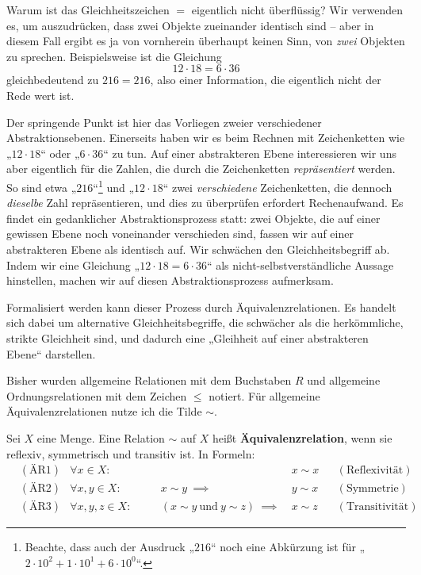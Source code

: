 \begin{bem} \label{aequirelphilo}
    Warum ist das Gleichheitszeichen $=$ eigentlich nicht überflüssig? Wir verwenden es, um auszudrücken, dass zwei Objekte zueinander identisch sind -- aber in diesem Fall ergibt es ja von vornherein überhaupt keinen Sinn, von \emph{zwei} Objekten zu sprechen. Beispielsweise ist die Gleichung
        \[ 12\cdot 18 = 6\cdot 36 \]
    gleichbedeutend zu $216=216$, also einer Information, die eigentlich nicht der Rede wert ist.
    
    Der springende Punkt ist hier das Vorliegen zweier verschiedener Abstraktionsebenen. Einerseits haben wir es beim Rechnen mit Zeichenketten wie „$12\cdot 18$“ oder „$6\cdot 36$“ zu tun. Auf einer abstrakteren Ebene interessieren wir uns aber eigentlich für die Zahlen, die durch die Zeichenketten \emph{repräsentiert} werden. So sind etwa „$216$“\footnote{Beachte, dass auch der Ausdruck „$216$“ noch eine Abkürzung ist für „$2\cdot 10^2 + 1\cdot 10^1 + 6 \cdot 10^0$“.} und „$12\cdot 18$“ zwei \emph{verschiedene} Zeichenketten, die dennoch \emph{dieselbe} Zahl repräsentieren, und dies zu überprüfen erfordert Rechenaufwand. Es findet ein gedanklicher Abstraktionsprozess statt: zwei Objekte, die auf einer gewissen Ebene noch voneinander verschieden sind, fassen wir auf einer abstrakteren Ebene als identisch auf. Wir schwächen den Gleichheitsbegriff ab. Indem wir eine Gleichung „$12\cdot 18=6\cdot 36$“ als nicht-selbstverständliche Aussage hinstellen, machen wir auf diesen Abstraktionsprozess aufmerksam.
    
    Formalisiert werden kann dieser Prozess durch Äquivalenzrelationen. Es handelt sich dabei um alternative Gleichheitsbegriffe, die schwächer als die herkömmliche, strikte Gleichheit sind, und dadurch eine „Gleihheit auf einer abstrakteren Ebene“ darstellen.

    Bisher wurden allgemeine Relationen mit dem Buchstaben $R$ und allgemeine Ordnungsrelationen mit dem Zeichen $\le$ notiert. Für allgemeine Äquivalenzrelationen nutze ich die Tilde $\sim$.
\end{bem}


\begin{defin} \label{def:aequirel} 
    Sei $X$ eine Menge. Eine Relation $\sim$ auf $X$ heißt \textbf{Äquivalenzrelation}, wenn sie reflexiv, symmetrisch und transitiv ist. In Formeln:
    \begin{align*}
        & (\text{ÄR1}) & \forall x\in X:&&\quad & x\sim x && (\text{Reflexivität}) \\
        & (\text{ÄR2}) & \forall x,y\in X:&&\quad x\sim y\ \implies\ & y\sim x && (\text{Symmetrie}) \\
    & (\text{ÄR3}) & \forall x,y,z\in X:&&\quad (x\sim y\ \text{und}\ y\sim z)\ \implies\ & x\sim z && (\text{Transitivität})
    \end{align*}
\end{defin}


